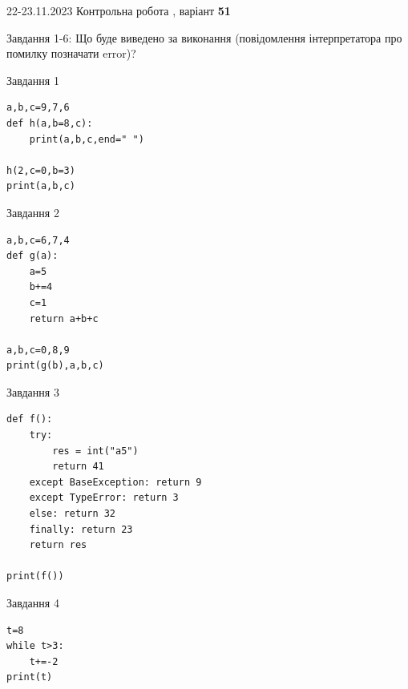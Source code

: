 \documentclass[12pt, ukrainian]{article}
\begin{document}
{{22-23.11.2023 Контрольна робота , варіант  \No \textbf { 51 }\par}}
{

Завдання 1-6: Що буде виведено за виконання (повідомлення інтерпретатора про помилку позначати error)?


\begin{minipage}[t]{9.7cm}                
{\begin{center}Завдання {1}\end{center}}
\begin{verbatim}
a,b,c=9,7,6
def h(a,b=8,c):
    print(a,b,c,end=" ")

h(2,c=0,b=3)
print(a,b,c)
\end{verbatim}     
\end{minipage}
\vline \hspace{8mm}
\begin{minipage}[t]{8.0cm}                
{\begin{center}Завдання {2}\end{center}}
\begin{verbatim}
a,b,c=6,7,4
def g(a):
    a=5
    b+=4
    c=1
    return a+b+c

a,b,c=0,8,9
print(g(b),a,b,c)
\end{verbatim}     
\end{minipage}

\vspace{15mm}
\begin{minipage}[t]{9.7cm}                
{\begin{center}Завдання {3}\end{center}}
\begin{verbatim}
def f():
    try:
        res = int("a5")
        return 41
    except BaseException: return 9
    except TypeError: return 3
    else: return 32
    finally: return 23
    return res

print(f())
\end{verbatim}     
\end{minipage}
\vline \hspace{8mm}
\begin{minipage}[t]{8.0cm}                
{\begin{center}Завдання {4}\end{center}}
\begin{verbatim}
t=8
while t>3:
    t+=-2
print(t)
\end{verbatim}     
\end{minipage}

}
\end{document}
